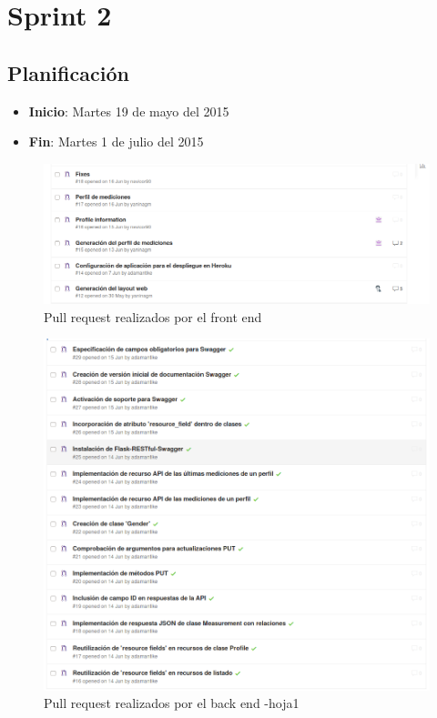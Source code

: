 \section{Sprint 2} %
\subsection{Planificación}

\begin{itemize}
    \item \textbf{Inicio}: Martes 19 de mayo del 2015
    \item \textbf{Fin}: Martes 1 de julio del 2015 
\end{itemize}

\begin{figure}[h]
  \centering
  \includegraphics[width=.8\textwidth]{img/2-PR}
  \caption{Pull request realizados por el front end}
  \label{2-PR}
\end{figure}
\begin{figure}[h]
  \centering
  \includegraphics[width=.8\textwidth]{img/2-PR_back2}
  \caption{Pull request realizados por el back end -hoja1}
  \label{2-PR_back2}
\end{figure}

